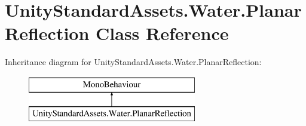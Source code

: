 \hypertarget{class_unity_standard_assets_1_1_water_1_1_planar_reflection}{}\section{Unity\+Standard\+Assets.\+Water.\+Planar\+Reflection Class Reference}
\label{class_unity_standard_assets_1_1_water_1_1_planar_reflection}
Inheritance diagram for Unity\+Standard\+Assets.\+Water.\+Planar\+Reflection\+:\begin{figure}[H]
\begin{center}
\leavevmode
\includegraphics[height=2.000000cm]{class_unity_standard_assets_1_1_water_1_1_planar_reflection}
\end{center}
\end{figure}
